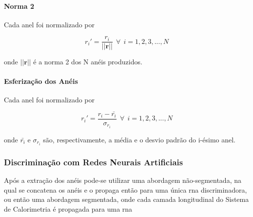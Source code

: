 \paragraph{Norma 2}
\label{par:norm2}

Cada anel foi normalizado por

\begin{equation}
r_{i}' = \frac{r_i}{||\mathbf{r}||}~~\forall~~i=1,2,3,...,N
\end{equation}

\noindent onde $||\mathbf{r}||$ é a norma 2 dos N anéis produzidos.


%
%
%


\paragraph{Esferização dos Anéis}

Cada anel foi normalizado por

\begin{equation}
r_{i}' = \frac{r_i - \bar{r_i}}{\sigma_{r_i }}~~\forall~~i=1,2,3,...,N
\end{equation}

\noindent onde $\bar{r_i}$ e $\sigma_{r_i }$ são, respectivamente, a média e o desvio 
padrão do i-ésimo anel. 


\subsubsection{Discriminação com Redes Neurais Artificiais}
\label{sssec:rna}

Após a extração dos anéis pode-se utilizar uma abordagem não-segmentada, na qual
se concatena os anéis e o propaga então para uma única \gls{rna} discriminadora,
ou então uma abordagem segmentada, onde cada camada longitudinal do Sistema de
Calorimetria é propagada para uma \gls{rna} 

